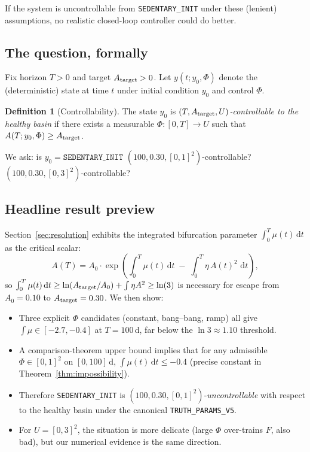 \documentclass[11pt,a4paper]{article}
\theoremstyle{definition}
\newtheorem{definition}[theorem]{Definition}
\newcommand{\dd}{\,\mathrm{d}}
\begin{document}
If the system is uncontrollable from \texttt{SEDENTARY\_INIT} under these (lenient) assumptions, no realistic closed-loop controller could do better.

\subsection{The question, formally}

Fix horizon $T > 0$ and target $A_{\rm target} > 0$. Let $y(t; y_0, \Phi)$ denote the (deterministic) state at time $t$ under initial condition $y_0$ and control $\Phi$.

\begin{definition}[Controllability]
The state $y_0$ is \emph{$(T, A_{\rm target}, U)$-controllable to the healthy basin} if there exists a measurable $\Phi \colon [0,T] \to U$ such that $A(T; y_0, \Phi) \ge A_{\rm target}$.
\end{definition}

We ask: is $y_0 = \texttt{SEDENTARY\_INIT}$ $(100, 0.30, [0,1]^2)$-controllable? $(100, 0.30, [0,3]^2)$-controllable?

\subsection{Headline result preview}

Section~\ref{sec:resolution} exhibits the integrated bifurcation parameter $\int_0^T \mu(t)\dd t$ as the critical scalar:
\[
A(T) = A_0 \cdot \exp\!\left(\int_0^T \mu(t) \dd t \;-\; \int_0^T \eta\,A(t)^2\,\dd t\right),
\]
so $\int_0^T \mu(t)\dd t \ge \ln(A_{\rm target}/A_0) + \int \eta A^2 \ge \ln(3)$ is necessary for escape from $A_0 = 0.10$ to $A_{\rm target} = 0.30$. We then show:

\begin{itemize}
  \item Three explicit $\Phi$ candidates (constant, bang--bang, ramp) all give $\int \mu \in [-2.7, -0.4]$ at $T=100$\,d, far below the $\ln 3 \approx 1.10$ threshold.
  \item A comparison-theorem upper bound implies that for any admissible $\Phi \in [0,1]^2$ on $[0,100]$\,d, $\int \mu(t)\dd t \le -0.4$ (precise constant in Theorem~\ref{thm:impossibility}).
  \item Therefore \texttt{SEDENTARY\_INIT} is $(100, 0.30, [0,1]^2)$-\emph{uncontrollable} with respect to the healthy basin under the canonical \texttt{TRUTH\_PARAMS\_V5}.
  \item For $U = [0,3]^2$, the situation is more delicate (large $\Phi$ over-trains $F$, also bad), but our numerical evidence is the same direction.
\end{itemize}
\end{document}
